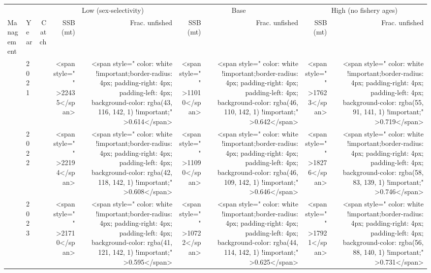 \begin{table}
\centering
\begin{tabular}[t]{>{}l|l>{}rr>{}r|rrrr}
\toprule
\multicolumn{1}{c}{ } & \multicolumn{1}{c}{ } & \multicolumn{1}{c}{ } & \multicolumn{2}{c}{Low (sex-selectivity)} & \multicolumn{2}{c}{Base} & \multicolumn{2}{c}{High (no fishery ages)} \\
\cmidrule(l{3pt}r{3pt}){4-5} \cmidrule(l{3pt}r{3pt}){6-7} \cmidrule(l{3pt}r{3pt}){8-9}
Management & Year & Catch & SSB   (mt) & Frac. unfished & SSB   (mt) & Frac. unfished & SSB   (mt) & Frac. unfished\\
\midrule
 & 2021 & \cellcolor[HTML]{B0A473}{\textcolor{white}{1200}} & <span style="     " >22435</span> & <span style="     color: white !important;border-radius: 4px; padding-right: 4px; padding-left: 4px; background-color: rgba(43, 116, 142, 1) !important;" >0.614</span> & <span style="     " >11010</span> & <span style="     color: white !important;border-radius: 4px; padding-right: 4px; padding-left: 4px; background-color: rgba(46, 110, 142, 1) !important;" >0.642</span> & <span style="     " >17623</span> & <span style="     color: white !important;border-radius: 4px; padding-right: 4px; padding-left: 4px; background-color: rgba(55, 91, 141, 1) !important;" >0.719</span>\\

 & 2022 & \cellcolor[HTML]{B0A473}{\textcolor{white}{1200}} & <span style="     " >22194</span> & <span style="     color: white !important;border-radius: 4px; padding-right: 4px; padding-left: 4px; background-color: rgba(42, 118, 142, 1) !important;" >0.608</span> & <span style="     " >11090</span> & <span style="     color: white !important;border-radius: 4px; padding-right: 4px; padding-left: 4px; background-color: rgba(46, 109, 142, 1) !important;" >0.646</span> & <span style="     " >18276</span> & <span style="     color: white !important;border-radius: 4px; padding-right: 4px; padding-left: 4px; background-color: rgba(58, 83, 139, 1) !important;" >0.746</span>\\

 & 2023 & \cellcolor[HTML]{B0A473}{\textcolor{white}{1200}} & <span style="     " >21710</span> & <span style="     color: white !important;border-radius: 4px; padding-right: 4px; padding-left: 4px; background-color: rgba(41, 121, 142, 1) !important;" >0.595</span> & <span style="     " >10722</span> & <span style="     color: white !important;border-radius: 4px; padding-right: 4px; padding-left: 4px; background-color: rgba(44, 114, 142, 1) !important;" >0.625</span> & <span style="     " >17921</span> & <span style="     color: white !important;border-radius: 4px; padding-right: 4px; padding-left: 4px; background-color: rgba(56, 88, 140, 1) !important;" >0.731</span>\\


\end{tabular}
\end{table}
